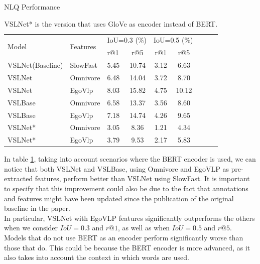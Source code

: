 \documentclass[10pt,twocolumn,letterpaper]{article}
\begin{document}
\begin{table}[h]
\centering
\small 
\caption{NLQ Performance}
\label{tab:performances}
\begin{tabular}{@{}p{2.4cm}p{1.0cm}lcccccc@{}}
\toprule
\multirow{2}{*}{Model} & \multirow{2}{*}{Features} & \multicolumn{2}{c}{IoU=0.3 (\%)} & \multicolumn{2}{c}{IoU=0.5 (\%)} \\ 
& & r@1  & r@5 & r@1   & r@5       \\ \midrule
VSLNet\hspace{0.2mm}(Baseline) & SlowFast & 5.45 & 10.74 & 3.12 & 6.63 \\ 
VSLNet & Omnivore & 6.48 & 14.04 & 3.72 & 8.70 \\ 
VSLNet & EgoVlp & 8.03 & 15.82 & 4.75 & 10.12 \\ 
VSLBase & Omnivore & 6.58 & 13.37 & 3.56 & 8.60 \\
VSLBase & EgoVlp & 7.18 & 14.74 & 4.26 & 9.65 \\
VSLNet* & Omnivore & 3.05 & 8.36 & 1.21 & 4.34 \\
VSLNet* & EgoVlp & 3.79 & 9.53 & 2.17 & 5.83 \\
\bottomrule
\end{tabular}
\captionsetup{font=footnotesize}
\caption*{VSLNet* is the version that uses GloVe as encoder instead of BERT.}
\end{table}
\vspace{0.2cm}
In table \ref{tab:performances}, taking into account scenarios where the BERT encoder is used, we can notice that both VSLNet and VSLBase, using Omnivore and EgoVLP as pre-extracted features, perform better than VSLNet using SlowFast. It is important to specify that this improvement could also be due to the fact that annotations and features might have been updated since the publication of the original baseline in the paper.
\\
In particular, VSLNet with EgoVLP features significantly outperforms the others when we consider $IoU = 0.3$ and $r@1$, as well as when $IoU = 0.5$ and $r@5$.
\\
Models that do not use BERT as an encoder perform significantly worse than those that do. This could be because the BERT encoder is more advanced, as it also takes into account the context in which words are used.
\end{document}
